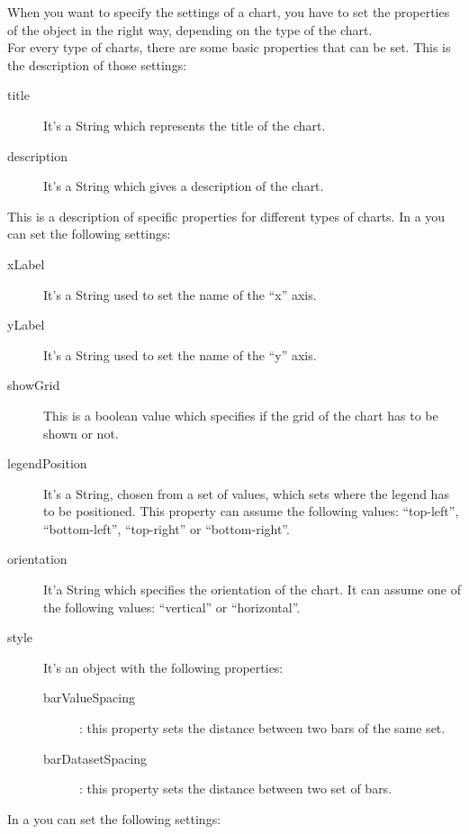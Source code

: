 		When you want to specify the settings of a chart, you have to set the properties of the  object in the right way, depending on the type of the chart.\\
		For every type of charts, there are some basic properties that can be set. This is the description of those settings:
		\begin{description}
			\item[title] It's a String which represents the title of the chart.
			\item[description] It's a String which gives a description of the chart.
		\end{description}
		This is a description of specific properties for different types of charts.
			In a  you can set the following settings:
			\begin{description}
				\item[xLabel] It's a String used to set the name of the “x” axis.
				\item[yLabel] It's a String used to set the name of the “y” axis.
				\item[showGrid] This is a boolean value which specifies if the grid of the chart has to be shown or not.
				\item[legendPosition] It's a String, chosen from a set of values, which sets where the legend has to be positioned. This property can assume the following values: “top-left”, “bottom-left”, “top-right” or “bottom-right”.
				\item[orientation] It'a String which specifies the orientation of the chart. It can assume one of the following values: “vertical” or “horizontal”.
				\item[style] It's an object with the following properties:
				\begin{description}
					\item[barValueSpacing]: this property sets the distance between two bars of the same set. 
					\item[barDatasetSpacing]: this property sets the distance between two set of bars.
				\end{description}
			\end{description}
			In a  you can set the following settings:
